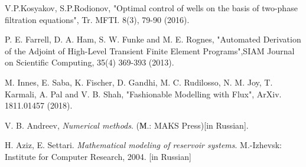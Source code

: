 \documentclass{article}
\begin{document}
\begin{thebibliography}{20}
 V.P.Kosyakov, S.P.Rodionov, "Optimal control of wells on the basis of two-phase filtration equations",  Tr. MFTI. 8(3), 79-90 (2016).

 P. E. Farrell, D. A. Ham, S. W. Funke and M. E. Rognes, "Automated Derivation of the Adjoint of High-Level Transient Finite Element Programs",SIAM Journal on Scientific Computing, 35(4) 369-393 (2013).

  M. Innes, E. Saba, K. Fischer, D. Gandhi, M. C. Rudilosso, N. M. Joy, T. Karmali, A. Pal and V. B. Shah, "Fashionable Modelling with Flux", ArXiv. 1811.01457 (2018).

 V. B. Andreev, \textit{Numerical methods}. (М.: MAKS Press)[in Russian].

 H. Aziz, E. Settari. \textit{Mathematical modeling of reservoir systems}.  M.-Izhevsk: Institute for Computer Research, 2004. [in Russian]


\end{thebibliography}
\end{document}
